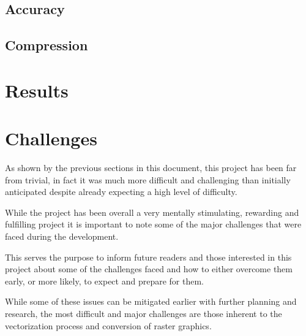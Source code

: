 \documentclass[12pt]{article}
\newcommand{\sentence}{} %
\begin{document}
    \subsection{Accuracy}\label{subsec:accuracy}


    \subsection{Compression}\label{subsec:compression}


    \pagebreak


    \section{Results}\label{sec:results}

    \pagebreak


    \section{Challenges}\label{sec:challenges}

    \tab
    As shown by the previous sections in this document, this project has been far from trivial, in fact it was much
    more difficult and challenging than initially anticipated despite already expecting a high level of difficulty.
    \sentence
    While the project has been overall a very mentally stimulating, rewarding and fulfilling project it is important
    to note some of the major challenges that were faced during the development.
    \sentence
    This serves the purpose to inform future readers and those interested in this project about some of the
    challenges faced and how to either overcome them early, or more likely, to expect and prepare for them.
    \sentence
    While some of these issues can be mitigated earlier with further planning and research, the most difficult and
    major challenges are those inherent to the vectorization process and conversion of raster graphics.
\end{document}
